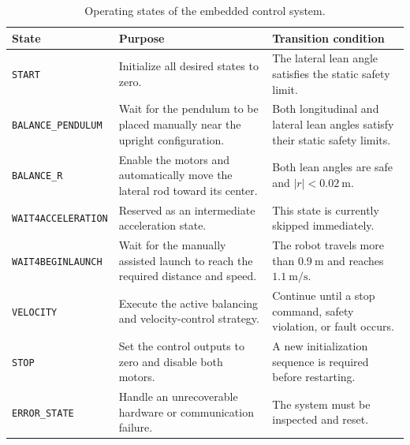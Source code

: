 \begin{table}[htbp]
  \centering
  \small
  \renewcommand{\arraystretch}{1.3}
  \caption{Operating states of the embedded control system.}
  \label{tab:embedded-states}
  \begin{tabular}{
    p{}
    p{}
    p{}
  }
    \hline
    \textbf{State}
    &
    \textbf{Purpose}
    &
    \textbf{Transition condition}
    \\
    \hline

    \texttt{START}
    &
    Initialize all desired states to zero.
    &
    The lateral lean angle satisfies the static safety limit.
    \\

    \texttt{BALANCE\_PENDULUM}
    &
    Wait for the pendulum to be placed manually near the upright configuration.
    &
    Both longitudinal and lateral lean angles satisfy their static safety limits.
    \\

    \texttt{BALANCE\_R}
    &
    Enable the motors and automatically move the lateral rod toward its center.
    &
    Both lean angles are safe and $|r|<0.02~\mathrm{m}$.
    \\

    \texttt{WAIT4ACCELERATION}
    &
    Reserved as an intermediate acceleration state.
    &
    This state is currently skipped immediately.
    \\

    \texttt{WAIT4BEGINLAUNCH}
    &
    Wait for the manually assisted launch to reach the required distance and speed.
    &
    The robot travels more than $0.9~\mathrm{m}$ and reaches $1.1~\mathrm{m/s}$.
    \\

    \texttt{VELOCITY}
    &
    Execute the active balancing and velocity-control strategy.
    &
    Continue until a stop command, safety violation, or fault occurs.
    \\

    \texttt{STOP}
    &
    Set the control outputs to zero and disable both motors.
    &
    A new initialization sequence is required before restarting.
    \\

    \texttt{ERROR\_STATE}
    &
    Handle an unrecoverable hardware or communication failure.
    &
    The system must be inspected and reset.
    \\

    \hline
  \end{tabular}
\end{table}

